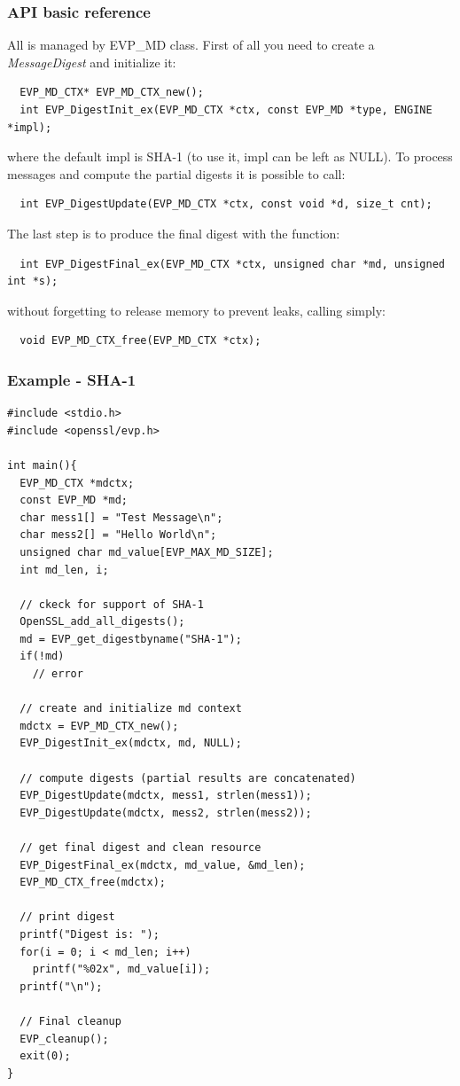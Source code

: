 \subsubsection*{API basic reference}
All is managed by EVP\_MD class.
First of all you need to create a \textit{MessageDigest} and initialize it:
\begin{verbatim}
  EVP_MD_CTX* EVP_MD_CTX_new();
  int EVP_DigestInit_ex(EVP_MD_CTX *ctx, const EVP_MD *type, ENGINE *impl);
\end{verbatim}
where the default impl is SHA-1 (to use it, impl can be left as NULL). To process messages and compute the partial digests it is possible to call:
\begin{verbatim}
  int EVP_DigestUpdate(EVP_MD_CTX *ctx, const void *d, size_t cnt);
\end{verbatim}
The last step is to produce the final digest with the function:
\begin{verbatim}
  int EVP_DigestFinal_ex(EVP_MD_CTX *ctx, unsigned char *md, unsigned int *s);
\end{verbatim}
without forgetting to release memory to prevent leaks, calling simply:
\begin{verbatim}
  void EVP_MD_CTX_free(EVP_MD_CTX *ctx);
\end{verbatim}

\subsubsection*{Example - SHA-1}
\begin{verbatim}
#include <stdio.h>
#include <openssl/evp.h>

int main(){
  EVP_MD_CTX *mdctx;
  const EVP_MD *md;
  char mess1[] = "Test Message\n";
  char mess2[] = "Hello World\n";
  unsigned char md_value[EVP_MAX_MD_SIZE];
  int md_len, i;

  // ckeck for support of SHA-1
  OpenSSL_add_all_digests();
  md = EVP_get_digestbyname("SHA-1");
  if(!md)
    // error
    
  // create and initialize md context
  mdctx = EVP_MD_CTX_new();
  EVP_DigestInit_ex(mdctx, md, NULL);
  
  // compute digests (partial results are concatenated)
  EVP_DigestUpdate(mdctx, mess1, strlen(mess1));
  EVP_DigestUpdate(mdctx, mess2, strlen(mess2));
  
  // get final digest and clean resource
  EVP_DigestFinal_ex(mdctx, md_value, &md_len);
  EVP_MD_CTX_free(mdctx);

  // print digest
  printf("Digest is: ");
  for(i = 0; i < md_len; i++)
    printf("%02x", md_value[i]);
  printf("\n");

  // Final cleanup
  EVP_cleanup();
  exit(0);
}
\end{verbatim}
\newpage

